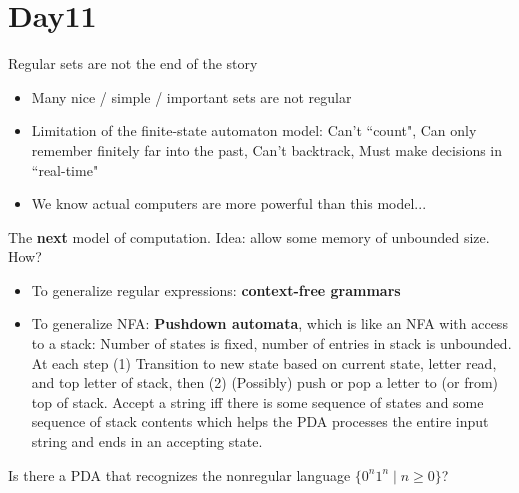 \documentclass[12pt, oneside]{article}
\begin{document}
\section*{Day11}


Regular sets are not the end of the story
\begin{itemize}
    \item Many nice / simple / important sets are not regular
    \item Limitation of the finite-state automaton model: Can't ``count", Can only remember finitely far into the past,
    Can't backtrack, Must make decisions in ``real-time"
    \item We know actual computers are more powerful than this model...
\end{itemize}

The {\bf next} model of computation. Idea: allow some memory of unbounded size. How? 
\begin{itemize}
    \item To generalize regular expressions: {\bf context-free grammars}\\
    \item To generalize NFA: {\bf Pushdown automata}, which is like an NFA with access to a stack: 
    Number of states is fixed, number of entries in stack is unbounded. At each step
    (1) Transition to new state based on current state, letter read, and top letter of stack, then
    (2) (Possibly) push or pop a letter to (or from) top of stack. Accept a string iff
    there is some sequence of states and some sequence of stack contents 
    which helps the PDA processes the entire input string and ends in an accepting state.
\end{itemize}

\vfill

\vfill

Is there a PDA that recognizes the nonregular language $\{0^n1^n \mid n \geq 0 \}$?

\vfill

\newpage

\end{document}
